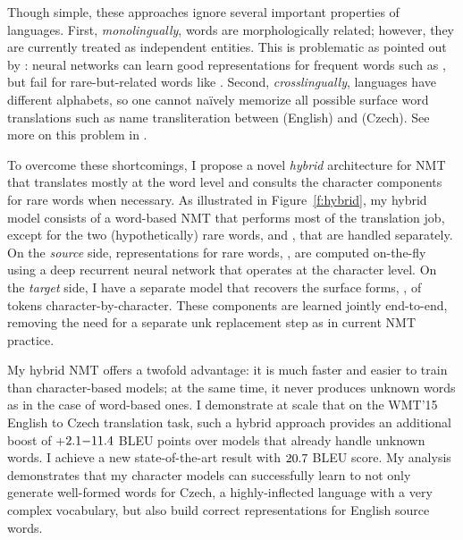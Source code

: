 Though simple, these approaches ignore several important
properties of languages. First, {\it monolingually}, words are morphologically
related; however, they are currently treated as independent entities. This is
problematic as pointed out by
: neural networks can learn good
representations for frequent words such as , but fail for
rare-but-related words like . Second, {\it crosslingually},
languages have different alphabets, so one cannot na\"{i}vely memorize all
possible surface word translations such as name transliteration between 
 (English) and  (Czech). See more on this problem
in \cite{sennrich16sub}.

To overcome these shortcomings, I propose a novel {\it hybrid} architecture for NMT
that translates mostly at the word level and consults the character
components for rare words when necessary. As illustrated in
Figure~\ref{f:hybrid}, my hybrid model consists of a word-based NMT that
performs most of the translation job, except for the two (hypothetically) rare words,
 and , that are handled separately. On the {\it source}
side, representations for rare words, , are
computed on-the-fly using a deep recurrent neural network that operates at the
character level. On the {\it target} side, I have a separate model that
recovers the surface forms, , of \unk{} tokens character-by-character.
These components are learned jointly end-to-end, removing the need for a separate
unk replacement step as in current NMT practice.

My hybrid NMT offers a twofold advantage: it is much faster and easier to
train than character-based models; at the same time, it never produces unknown
words as in the case of word-based ones.
I demonstrate at scale that on the WMT'15 English to
Czech translation task, such a hybrid approach provides
an additional boost of +$2.1{-}11.4{}$ BLEU points over models 
that already handle unknown words.
I achieve a new state-of-the-art result with
$20.7{}$ BLEU score.
My analysis demonstrates that my character models can successfully learn to not
only generate well-formed words for Czech, a
highly-inflected language with a very complex vocabulary, but also build correct
representations for English source words.


